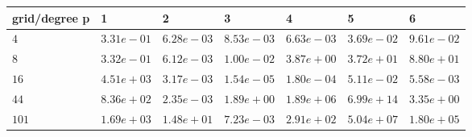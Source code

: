 \begin{tabular}{lllllll}
\hline
 grid/degree p   & 1          & 2          & 3          & 4          & 5          & 6          \\
\hline
 $4$             & $3.31e-01$ & $6.28e-03$ & $8.53e-03$ & $6.63e-03$ & $3.69e-02$ & $9.61e-02$ \\
 $8$             & $3.32e-01$ & $6.12e-03$ & $1.00e-02$ & $3.87e+00$ & $3.72e+01$ & $8.80e+01$ \\
 $16$            & $4.51e+03$ & $3.17e-03$ & $1.54e-05$ & $1.80e-04$ & $5.11e-02$ & $5.58e-03$ \\
 $44$            & $8.36e+02$ & $2.35e-03$ & $1.89e+00$ & $1.89e+06$ & $6.99e+14$ & $3.35e+00$ \\
 $101$           & $1.69e+03$ & $1.48e+01$ & $7.23e-03$ & $2.91e+02$ & $5.04e+07$ & $1.80e+05$ \\
\hline
\end{tabular}
